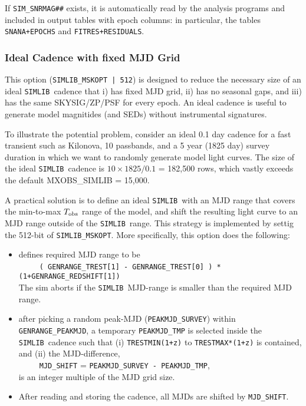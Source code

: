 \documentclass[12pt]{article}
\newcommand{\Tobs}{T_{\rm obs}}
\newcommand{\simlib}{{\tt SIMLIB}}
\begin{document}
{If {\tt SIM\_SNRMAG\#\#} exists, it is automatically read
by the analysis programs and included in output tables with epoch columns:
in particular, the tables {\tt SNANA+EPOCHS} and {\tt FITRES+RESIDUALS}.


\subsubsection{Ideal Cadence with fixed MJD Grid}
\label{sssec:IDEAL_GRID}

This option ({\tt SIMLIB\_MSKOPT | 512}) is designed to reduce the necessary
size of an ideal \simlib\ cadence that 
i) has fixed MJD grid, ii) has no seasonal gaps, and iii) has the same
SKYSIG/ZP/PSF for every epoch. An ideal cadence is useful to generate model
magnitides (and SEDs) without instrumental signatures. 

To illustrate the potential problem, consider an ideal 0.1 day cadence for
a fast transient such as Kilonova, 10 passbands, and a 5 year (1825 day)
survey duration in which we want to randomly generate model light curves.
The size of the ideal \simlib\ cadence is $10\times 1825/0.1$ = 182,500 rows,
which vastly exceeds the default {MXOBS\_SIMLIB = 15,000}.

A practical solution is to define an ideal \simlib\ with an MJD range
that covers the min-to-max $\Tobs$ range of the model, and shift the resulting
light curve to an MJD range outside of the \simlib\ range. This strategy is
implemented by settig the 512-bit of {\tt SIMLIB\_MSKOPT}. More specifically,
this option does the following:
\begin{itemize}
   \item defines required MJD range to be \\
        ~~~~~{\tt ( GENRANGE\_TREST[1] - GENRANGE\_TREST[0] ) * (1+GENRANGE\_REDSHIFT[1])} \\
        The sim aborts if the \simlib\
        MJD-range is smaller than the required MJD range.
% 
   \item after picking a random peak-MJD ({\tt PEAKMJD\_SURVEY})
         within {\tt GENRANGE\_PEAKMJD}, a temporary {\tt PEAKMJD\_TMP} is selected
         inside the \simlib\ cadence such that 
          (i) {\tt TRESTMIN(1+z)} to {\tt TRESTMAX*(1+z)} is contained, and 
         (ii) the MJD-difference, \\
         ~~~~~{\tt MJD\_SHIFT} = {\tt PEAKMJD\_SURVEY - PEAKMJD\_TMP}, \\
         is an integer multiple of the MJD grid size.
% 
   \item After reading and storing the cadence, all MJDs are shifted by {\tt MJD\_SHIFT}.
\end{itemize}

}
\end{document}
